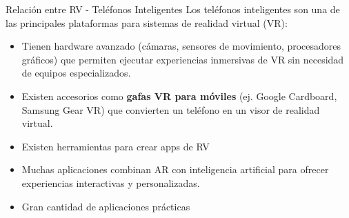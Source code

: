 \begin{frame}{Relación entre RV - Teléfonos Inteligentes}
Los teléfonos inteligentes son una de las principales plataformas para sistemas de realidad virtual (VR):  
\begin{itemize}
\item Tienen hardware avanzado (cámaras, sensores de movimiento, procesadores gráficos) que permiten ejecutar experiencias inmersivas de VR sin necesidad de equipos especializados.  
\item Existen accesorios como \textbf{gafas VR para móviles} (ej. Google Cardboard, Samsung Gear VR) que convierten un teléfono en un visor de realidad virtual.  
\item Existen herramientas para crear apps de  RV
\item Muchas aplicaciones combinan AR con inteligencia artificial para ofrecer experiencias interactivas y personalizadas.  
\item Gran cantidad de aplicaciones prácticas
\end{itemize}
\end{frame}
